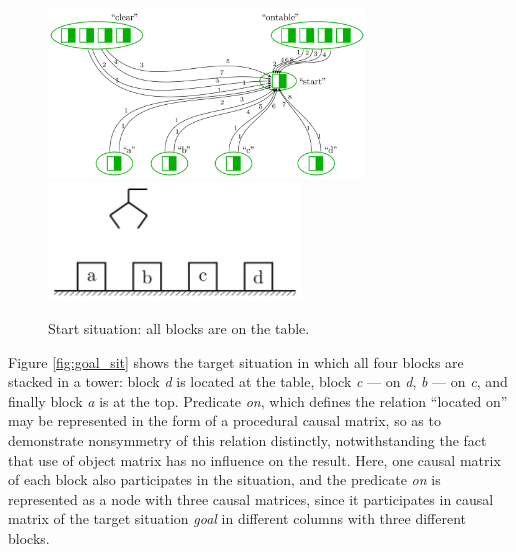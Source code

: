 \documentclass[review]{elsarticle}
\begin{document}
\begin{figure}
	\centering
	\includegraphics[width=0.75\textwidth]{plan_nets-2}
	\includegraphics[width=0.6\textwidth]{block_world-1}
	\caption{Start situation: all blocks are on the table.}	
	\label{fig:start_sit}	
\end{figure}

Figure \ref{fig:goal_sit} shows the target situation in which all four blocks are stacked in a tower: block \textit{d} is located at the table, block \textit{c} --- on \textit{d}, \textit{b} --- on \textit{c}, and finally block \textit{a} is at the top. Predicate \textit{on}, which defines the relation ``located on'' may be represented in the form of a procedural causal matrix, so as to demonstrate nonsymmetry of this relation distinctly, notwithstanding the fact that use of object matrix has no influence on the result. Here, one causal matrix of each block also participates in the situation, and the predicate \textit{on} is represented as a node with three causal matrices, since it participates in causal matrix of the target situation \textit{goal} in different columns with three different blocks.
\end{document}
